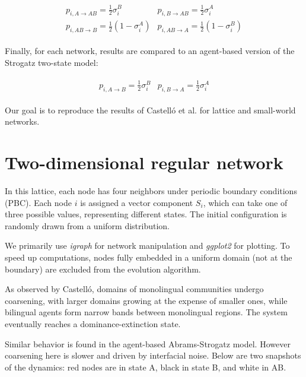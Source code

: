 \begin{align}
\begin{array}{cc}
p_{i,A \to AB} = \frac{1}{2} \sigma_{i}^B & p_{i,B \to AB} = \frac{1}{2} \sigma_{i}^A \\[10pt]
p_{i,AB \to B} = \frac{1}{2} (1 - \sigma_{i}^A) & p_{i,AB \to A} = \frac{1}{2} (1 - \sigma_{i}^B)
\label{AB_eq}
\end{array}
\end{align}

Finally, for each network, results are compared to an agent-based version of the Strogatz two-state model:

\begin{align}
\begin{array}{cc}
p_{i,A \to B} = \frac{1}{2} \sigma_{i}^B & p_{i,B \to A} = \frac{1}{2} \sigma_{i}^A
\label{Strogatz_eq}
\end{array}
\end{align}

Our goal is to reproduce the results of Castelló et al. \cite{Castello2008} for lattice and small-world networks.



\section{Two-dimensional regular network}
In this lattice, each node has four neighbors under periodic boundary conditions (PBC). Each node \(i\) is assigned a vector component \(S_i\), which can take one of three possible values, representing different states. The initial configuration is randomly drawn from a uniform distribution.

We primarily use \textsl{igraph} for network manipulation and \textsl{ggplot2} for plotting. To speed up computations, nodes fully embedded in a uniform domain (not at the boundary) are excluded from the evolution algorithm.

As observed by Castelló, domains of monolingual communities undergo coarsening, with larger domains growing at the expense of smaller ones, while bilingual agents form narrow bands between monolingual regions. The system eventually reaches a dominance-extinction state.

Similar behavior is found in the agent-based Abrams-Strogatz model. However coarsening here is slower and driven by interfacial noise.
Below are two snapshots of the dynamics: red nodes are in state A, black in state B, and white in AB.

